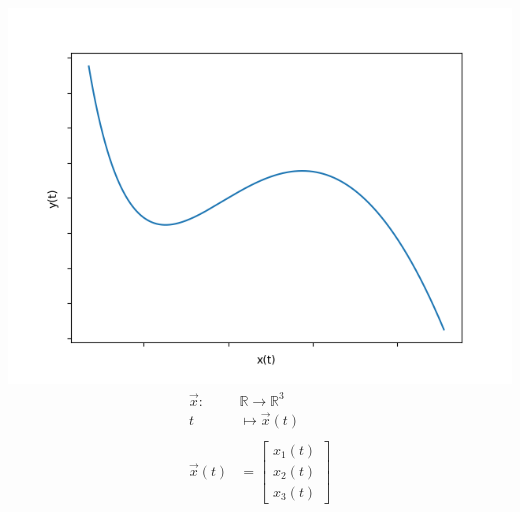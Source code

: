 \documentclass[a4paper,12pt]{article}
\begin{document}
\includegraphics[scale=0.4]{example_curve} \\
\begin{align*}
	\vec{x}: & \mathbb{R} \rightarrow \mathbb{R}^3 \\
	t &\mapsto \vec{x}(t) \\\\
	\vec{x}(t) & = \begin{bmatrix} x_1(t) \\ x_2(t) \\ x_3(t) \end{bmatrix}
\end{align*}
\end{document}
